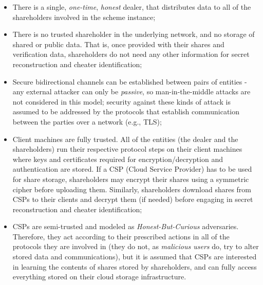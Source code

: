 \documentclass[10pt,journal,cspaper,compsoc]{IEEEtran}
\begin{document}
\begin{itemize}
\item There is a single, \emph{one-time}, \emph{honest} dealer, that distributes data to all of the  shareholders involved in the scheme instance;
\item There is no trusted shareholder in the underlying network, and no storage of shared or public data. That is, once provided with their shares and verification data, shareholders do not need any other information for secret reconstruction and cheater identification;
\item Secure bidirectional channels can be established between pairs of entities - any external attacker can only be \emph{passive}, so man-in-the-middle attacks are not considered in this model; security against these kinds of attack is assumed to be addressed by the protocols that establish communication between the parties over a network (e.g., TLS);
\item Client machines are fully trusted. All of the entities (the dealer and the shareholders) run their respective protocol steps on their client machines where keys and certificates required for encryption/decryption and authentication are stored. If a CSP (Cloud Service Provider) has to be used for share storage, shareholders may encrypt their shares using a symmetric cipher before uploading them. Similarly, shareholders download shares from CSPs to their clients and decrypt them (if needed) before engaging in secret reconstruction and cheater identification; 
\item CSPs are semi-trusted and modeled as \emph{Honest-But-Curious} adversaries. Therefore, they act according to their prescribed actions in all of the protocols they are involved in (they do not, as \emph{malicious users} do, try to alter stored data and communications), but it is assumed that CSPs are interested in learning the contents of shares stored by shareholders, and can fully access everything stored on their cloud storage infrastructure. \end{itemize}
\end{document}
